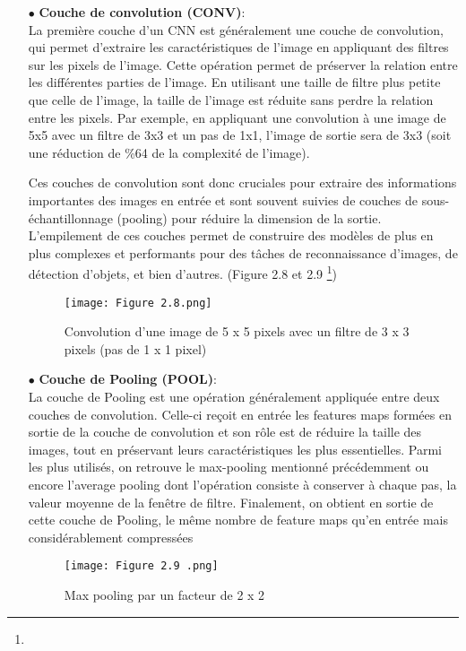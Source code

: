 \begin{itemize}
    \item [$\bullet$]\textbf{Couche de convolution (CONV)}:\\
    La première couche d'un CNN est généralement une couche de convolution, qui permet d'extraire les caractéristiques de l'image en appliquant des filtres sur les pixels de l'image. Cette opération permet de préserver la relation entre les différentes parties de l'image. En utilisant une taille de filtre plus petite que celle de l'image, la taille de l'image est réduite sans perdre la relation entre les pixels. Par exemple, en appliquant une convolution à une image de 5x5 avec un filtre de 3x3 et un pas de 1x1, l'image de sortie sera de 3x3 (soit une réduction de \%64 
    de la complexité de l'image).
    
\par Ces couches de convolution sont donc cruciales pour extraire des informations importantes des images en entrée et sont souvent suivies de couches de sous-échantillonnage (pooling) pour réduire la dimension de la sortie. L'empilement de ces couches permet de construire des modèles de plus en plus complexes et performants pour des tâches de reconnaissance d'images, de détection d'objets, et bien d'autres. (Figure 2.8 et 2.9 \footnote{})
\clearpage
\begin{figure}[!h]
  \centering
  \texttt{[image: Figure 2.8.png]}
  \caption{Convolution d'une image de 5 x 5 pixels avec un filtre de 3 x 3 pixels (pas de 1 x 1 pixel) }
  \label{fig:CONV}
\end{figure}


 \vspace{0.5em}
    \item [$\bullet$]\textbf{Couche de Pooling  (POOL)}:\\
  La couche de Pooling est une opération généralement appliquée entre deux couches de convolution. Celle-ci reçoit en entrée les features maps formées en sortie de la couche de convolution et son rôle est de réduire la taille des images, tout en préservant leurs caractéristiques les plus essentielles. Parmi les plus utilisés, on retrouve le max-pooling mentionné précédemment ou encore l’average pooling dont l’opération consiste à conserver à chaque pas, la valeur moyenne de la fenêtre de filtre. 
Finalement, on obtient en sortie de cette couche de Pooling, le même nombre de feature maps qu’en entrée mais considérablement compressées
\begin{figure}[!h]
  \centering
  \texttt{[image: Figure 2.9 .png]}
  \caption{Max pooling par un facteur de 2 x 2 }
  \label{fig:POOL}
\end{figure}


\end{itemize}
